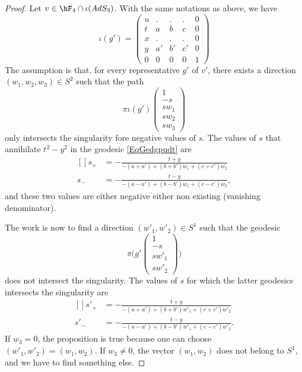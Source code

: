 	\begin{proof}
		Let $v\in\hF_4\cap\iota(AdS_3)$. With the same notations as above, we have
		\begin{equation}		\label{EqRepresSOiotag}
			\iota(g')=
			\begin{pmatrix}
				u & .  & .  & .  & 0 \\
				t & a  & b  & c  & 0 \\
				x & .  & .  & .  & 0 \\
				y & a' & b' & c' & 0 \\
				0 & 0  & 0  & 0  & 1
			\end{pmatrix}
		\end{equation}
		The assumption is that, for every representative $g'$ of $v'$, there exists a direction $(w_1,w_2,w_3)\in S^2$ such that the path
		\begin{equation}		\label{EqGedgpudt}
			\pi   \iota(g')\begin{pmatrix}
				1    \\
				-s   \\
				sw_1 \\
				sw_2 \\
				sw_3
			\end{pmatrix}
		\end{equation}
		only intersects the singularity fore negative values of $s$. The values of $s$ that annihilate $t^2-y^2$ in the geodesic \eqref{EqGedgpudt} are
		\begin{equation}
			\begin{aligned}[]
				s_+ & =-\frac{ t+y }{ -(a+a')+(b+b')w_1+(c+c')w_2 }  \\
				s_- & =-\frac{ t-y }{ -(a-a')+(b-b')w_1+(c-c')w_2 },
			\end{aligned}
		\end{equation}
		and these two values are either negative either non existing (vanishing denominator).

		The work is now to find a direction $(w'_1,w'_2)\in S^1$ such that the geodesic
		\begin{equation}
			\pi\big( g'\begin{pmatrix}
				1     \\
				-s    \\
				sw'_1 \\
				sw'_2
			\end{pmatrix} \big)
		\end{equation}
		does not intersect the singularity. The values of $s$ for which the latter geodesics intersects the singularity are
		\begin{equation}
			\begin{aligned}[]
				s'_+ & =-\frac{ t+y }{ -(a+a')+(b+b')w'_1+(c+c')w'_2 }  \\
				s'_- & =-\frac{ t-y }{ -(a-a')+(b-b')w'_1+(c-c')w'_2 }.
			\end{aligned}
		\end{equation}
		If $w_3=0$, the proposition is true because one can choose $(w'_1,w'_2)=(w_1,w_2)$. If $w_3\neq 0$, the vector $(w_1,w_2)$ does not belong to $S^1$, and we have to find something else.


\end{proof}
